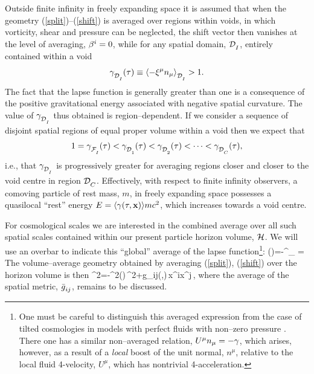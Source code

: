 \documentclass[12pt]{article}
\begin{document}
Outside finite infinity in freely expanding space it is assumed that
when the geometry (\ref{split})--(\ref{shift}) is averaged over regions
within voids, in which vorticity, shear and pressure can be neglected,
the shift vector then vanishes at the level of averaging,
$\beta^i=0$, while for any spatial domain, $\DD\Z I$, entirely contained within
a void
$$\ga\Z{\DD\X I}(\tc)\equiv\ave{-\xi^\mu n_\mu}\Z{\DD\X I}>1.$$
The fact that the lapse function is generally greater than one is a consequence
of the positive gravitational energy associated with negative spatial
curvature. The value of $\ga\Z{\DD\X I}$ thus obtained is region--dependent.
If we consider a sequence of disjoint spatial regions of equal proper volume
within a void then we expect that
$$1= \ga\Z{\Fi}(\tc)<\ga\Z{\DD\X 1}(\tc)<\ga\Z{\DD\X 2}(\tc)<\cdots
<\ga\Z{\DD\X C}(\tc),$$
i.e., that $\ga\Z{\DD\X I}$ is progressively greater for averaging
regions closer and closer to the void centre in region $\DD\Z C$.
Effectively, with respect to finite infinity observers, a comoving particle
of rest mass, $m$, in freely expanding space possesses a quasilocal
``rest'' energy $E=\langle{\gamma(\tau,{\mathbf x})}\rangle mc^2$, which increases towards a
void centre.

For cosmological scales we are interested in the combined average
over all such spatial scales contained within our present
particle horizon volume, $\cal H$. We will use an overbar to indicate this
``global'' average of the lapse function\footnote{One must be careful to
distinguish this averaged expression from the case of tilted cosmologies in
models with perfect fluids with non--zero pressure \cite{KE}. There one has a
similar non--averaged relation, $U^\mu n_\mu=-\gamma$, which arises, however,
as a result of a {\em local} boost of the unit normal, $n^\mu$,
relative to the local fluid 4-velocity, $U^\mu$, which has
nontrivial 4-acceleration.}:
\beq \gb(\tc)\equiv\ave{\ga(\tc,\bx)}=-\xi^\mu\bn_\mu
=
\label{gab}\eeq
The volume--average geometry obtained by averaging
(\ref{split}), (\ref{shift}) over the horizon volume is then
\beq
\ds^2=-\gb^2(\tc)\,\dd\tc^2+\mean g_{ij}(\tc,\bx)\,\dd x^i\dd x^j\,,
\label{geom}\eeq
where the average of the spatial metric, $\mean g_{ij}$, remains to be
discussed.
\end{document}
